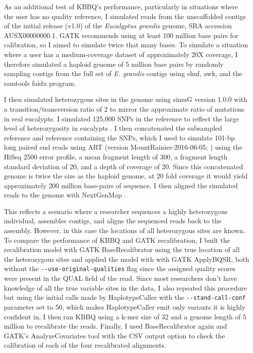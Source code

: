 As an additional test of KBBQ's performance, particularly in situations where the user has no quality reference, I simulated reads from the unscaffolded contigs of the initial release (v1.0) of the \textit{Eucalyptus grandis} genome, SRA accession AUSX00000000.1. GATK recommends using at least 100 million base pairs for calibration, so I aimed to simulate twice that many bases. To simulate a situation where a user has a medium-coverage dataset of approximately 20X coverage, I therefore simulated a haploid genome of 5 million base pairs by randomly sampling contigs from the full set of \textit{E. grandis} contigs using shuf, awk, and the samtools faidx program.

I then simulated heterozygous sites in the genome using simuG version 1.0.0 \parencite{yue_simug_2019} with a transition/transversion ratio of 2 to mirror the approximate ratio of mutations in real eucalypts. I simulated 125,000 SNPs in the reference to reflect the large level of heterozygosity in eucalypts \parencite{kulheim_comparative_2009}. I then concatenated the subsampled reference and reference containing the SNPs, which I used to simulate 101-bp long paired end reads using ART (version MountRainier-2016-06-05; \cite{huang_art_2012}) using the HiSeq 2500 error profile, a mean fragment length of 300, a fragment length standard deviation of 20, and a depth of coverage of 20. Since this concatenated genome is twice the size as the haploid genome, at 20 fold coverage it would yield approximately 200 million base-pairs of sequence. I then aligned the simulated reads to the genome with NextGenMap \parencite{sedlazeck_nextgenmap_2013}.

This reflects a scenario where a researcher sequences a highly heterozygous individual, assembles contigs, and aligns the sequenced reads back to the assembly. However, in this case the locations of all heterozygous sites are known. To compare the performance of KBBQ and GATK recalibration, I built the recalibration model with GATK BaseRecalibrator using the true location of all the heterozygous sites and applied the model with with GATK ApplyBQSR, both without the \texttt{-\phantom{}-use-original-qualities} flag since the assigned quality scores were present in the QUAL field of the read. Since most researchers don't have knowledge of all the true variable sites in the data, I also repeated this procedure but using the initial calls made by HaplotypeCaller with the \texttt{-\phantom{}-stand-call-conf} parameter set to 50, which makes HaplotypeCaller emit only variants it is highly confident in. I then ran KBBQ using a k-mer size of 32 and a genome length of 5 million to recalibrate the reads. Finally, I used BaseRecalibrator again and GATK's AnalyzeCovariates tool with the CSV output option to check the calibration of each of the four recalibrated alignments.

